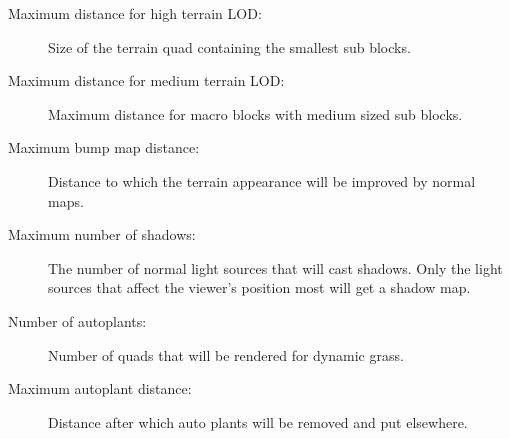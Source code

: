 \documentclass[a4paper]{article}
\begin{document}
\begin{description}
  \item[Maximum distance for high terrain LOD:] Size of the terrain quad containing the smallest sub blocks.
  \item[Maximum distance for medium terrain LOD:] Maximum distance for macro blocks with medium sized sub blocks.
  \item[Maximum bump map distance:] Distance to which the terrain appearance will be improved by normal maps.
  \item[Maximum number of shadows:] The number of normal light sources that will cast shadows. Only the light sources that affect the viewer's position most will get a shadow map.
  \item[Number of autoplants:] Number of quads that will be rendered for dynamic grass.
  \item[Maximum autoplant distance:] Distance after which auto plants will be removed and put elsewhere.
\end{description}
\end{document}
